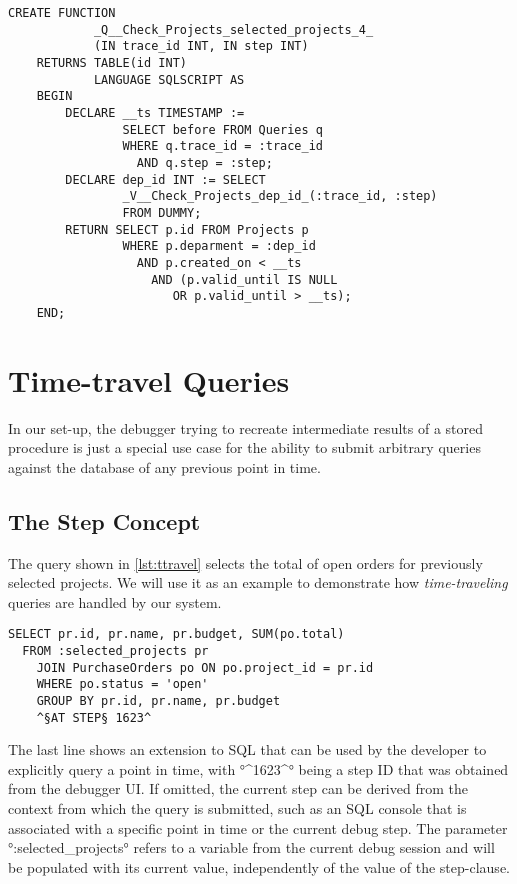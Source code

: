 \documentclass[english]{sig-alternate-05-2015}
\begin{document}
\begin{lstlisting}[language=HanaSQL,float,caption={Query view},label=lst:example4]
	CREATE FUNCTION 
			_Q__Check_Projects_selected_projects_4_ 
			(IN trace_id INT, IN step INT)
	RETURNS TABLE(id INT) 
			LANGUAGE SQLSCRIPT AS
	BEGIN
		DECLARE __ts TIMESTAMP := 
				SELECT before FROM Queries q 
				WHERE q.trace_id = :trace_id 
				  AND q.step = :step;
		DECLARE dep_id INT := SELECT 
				_V__Check_Projects_dep_id_(:trace_id, :step) 
				FROM DUMMY;
		RETURN SELECT p.id FROM Projects p
				WHERE p.deparment = :dep_id
				  AND p.created_on < __ts
					AND (p.valid_until IS NULL 
					   OR p.valid_until > __ts);
	END;
\end{lstlisting}


\section{Time-travel Queries}
\label{sec:ttqueries}

In our set-up, the debugger trying to recreate intermediate results of a stored procedure is just a special use case for the ability to submit arbitrary queries against the database of any previous point in time.

\subsection{The Step Concept}

The query shown in \cref{lst:ttravel} selects the total of open orders for previously selected projects.
We will use it as an example to demonstrate how \emph{time-traveling} queries are handled by our system.

\begin{lstlisting}[language=HanaSQL,float,caption={Example for a time-travel query: select the current total of open orders for previously selected projects},label=lst:ttravel]
  SELECT pr.id, pr.name, pr.budget, SUM(po.total)
  FROM :selected_projects pr
	JOIN PurchaseOrders po ON po.project_id = pr.id
	WHERE po.status = 'open'
	GROUP BY pr.id, pr.name, pr.budget
	^§AT STEP§ 1623^
\end{lstlisting}

The last line shows an extension to SQL that can be used by the developer to explicitly query a point in time, with °^1623^° being a step ID that was obtained from the debugger UI.
If omitted, the current step can be derived from the context from which the query is submitted, such as an SQL console that is associated with a specific point in time or the current debug step.
The parameter °:selected_projects° refers to a variable from the current debug session and will be populated with its current value, independently of the value of the step-clause.
\end{document}
